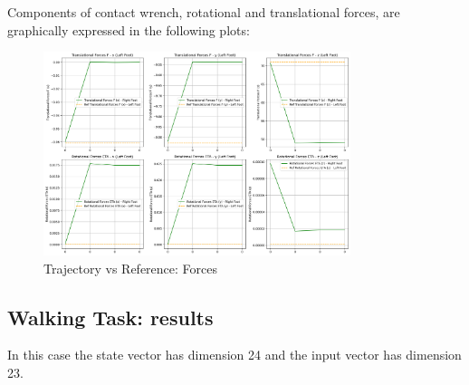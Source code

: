 \documentclass[main.tex]{subfiles}
\begin{document}
Components of contact wrench, rotational and translational forces, are graphically expressed in the following plots:
\begin{figure}[htbp]
    \centering
    \includegraphics[width=0.8\textwidth]{figures/contact_forces_still.png}
    \caption{Trajectory vs Reference: Forces}
    \label{fig:contact_forces_still}
\end{figure}

\subsection{Walking Task: results}
In this case the state vector has dimension 24 and the input vector has dimension 23.
\end{document}
